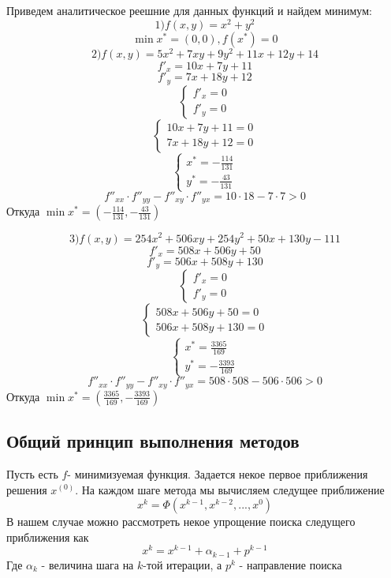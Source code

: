 \documentclass[a4paper, 14pt]{article}
\begin{document}
		Приведем аналитическое реешние для данных функций и найдем минимум:\\
		

		\[1) f(x, y) = x^2 + y^2\]
		\[\min x^* = (0, 0), f(x^*) = 0\]
		\[2) f(x, y) = 5x^2 + 7xy + 9y^2 + 11x + 12y + 14\]
		\[f'_x = 10x + 7y + 11\]
		\[f'_y = 7x + 18y + 12\]
		\[\begin{cases}
		f'_x = 0\\
		f'_y = 0
		\end{cases}\]
		\[\begin{cases}
		10x + 7y + 11 = 0\\
		7x + 18y + 12 = 0
		\end{cases}\]
		\[\begin{cases}
		x^* = -\frac{114}{131}\\
		y^* = -\frac{43}{131}
		\end{cases}\]
		\[f''_{xx} \cdot f''_{yy} - f''_{xy} \cdot f''_{yx} = 10 \cdot 18 - 7 \cdot 7 > 0\]
		Откуда $\min x^* = (-\frac{114}{131}, -\frac{43}{131})$ 
		
		\[3) f(x, y) = 254x^2 + 506xy + 254y^2 + 50x + 130y - 111\]
		\[f'_x = 508x + 506y + 50\]
		\[f'_y = 506x + 508y + 130\]
		\[\begin{cases}
		f'_x = 0\\
		f'_y = 0
		\end{cases}\]
		\[\begin{cases}
		508x + 506y + 50 = 0\\
		506x + 508y + 130 = 0
		\end{cases}\]
		\[\begin{cases}
		x^* = \frac{3365}{169}\\
		y^* = -\frac{3393}{169}
		\end{cases}\]
		\[f''_{xx} \cdot f''_{yy} - f''_{xy} \cdot f''_{yx} = 508 \cdot 508 - 506 \cdot 506 > 0\]
		Откуда $\min x^* = (\frac{3365}{169}, -\frac{3393}{169})$ 
		
		\subsection*{Общий принцип выполнения методов}
		Пусть есть $f$- минимизуемая функция. Задается некое первое приближения решения $x^{(0)}$. На каждом шаге метода мы вычисляем следущее приближение
		\[x^k = \Phi(x^{k - 1}, x^{k-2}, ..., x^0)\]
		В нашем случае можно рассмотреть некое упрощение поиска следущего приближения как
		\[x^k = x^{k-1} + \alpha_{k-1} + p^{k-1}\]
		Где $\alpha_k$ - величина шага на $k$-той итерации, а $p^k$ - направление поиска  
		
\end{document}
